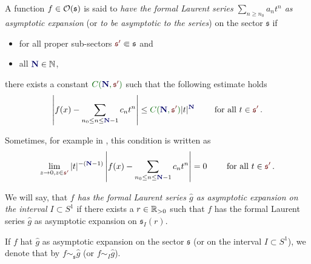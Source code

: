 \begin{defn}
  \def\myN{\textbf{\textcolor{blue!40!black}{N}}}
  \def\mySect{\textcolor{red!40!black}{\mathfrak{s}'}}
  \def\myConst{\textcolor{green!40!black}{C(\myN,\mySect)}}
  A function $f\in\mathcal{O}(\mathfrak{s})$ is said to \emph{have the formal Laurent
  series $\sum_{n\geq n_0}a_nt^n$ as asymptotic expansion} (or \emph{to be
  asymptotic to the series}) on the sector $\mathfrak{s}$ if
  \begin{itemize}
    \item for all proper sub-sectors $\mySect\Subset\mathfrak{s}$ and
    \item all $\myN\in\N$,
  \end{itemize}
  there exists a constant
  $\myConst$ such that the following estimate holds
  \[
    \left|
      f(x)-\sum_{n_0\leq n\leq \myN-1}c_nt^n
    \right|
    \leq \myConst|t|^{\myN} \qquad \text{ for all }t\in \mySect \,.
  \]
  \begin{rem}
    Sometimes, for example in \cite{sabbah_cimpa90}, this condition is written
    as
    \[
      \lim_{z\to0,z\in{\mySect}}
      |t|^{-(\myN-1)}
      \left|
        f(x)-\sum_{n_0\leq n\leq \myN-1}c_nt^n
      \right|=0
      \qquad \text{ for all } t\in \mySect \,.
    \]
  \end{rem}
  We will say, that \emph{$f$ has the formal Laurent series $\hat g$ as
  asymptotic expansion on the interval $I\subset S^1$} if there exists a
  $r\in\mathbb{R}_{>0}$ such that $f$ has the formal Laurent series $\hat g$ as
  asymptotic expansion on $\mathfrak{s}_I(r)$.
\end{defn}
If $f$ hat $\hat g$ as asymptotic expansion on the sector $\mathfrak{s}$ (or on
the interval $I\subset S^1$), we denote that by $f\sim_{\mathfrak{s}}\hat g$
(or $f\sim_{I}\hat g$).
